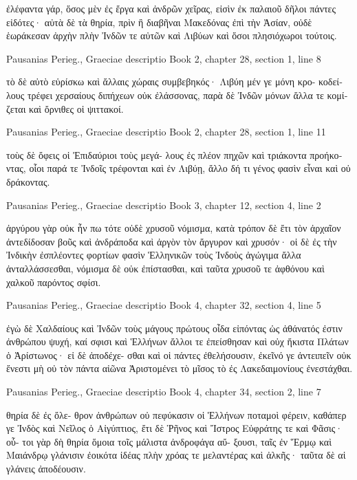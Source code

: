 \documentclass[12pt,letterpaper,twoside,final]{memoir}
\begin{document}
\begin{greek}
                                    ἐλέφαντα γάρ, ὅσος μὲν 
ἐς ἔργα καὶ ἀνδρῶν χεῖρας, εἰσὶν ἐκ παλαιοῦ δῆλοι 
πάντες εἰδότες· αὐτὰ δὲ τὰ θηρία, πρὶν ἢ διαβῆναι 
Μακεδόνας ἐπὶ τὴν Ἀσίαν, οὐδὲ ἑωράκεσαν ἀρχὴν πλὴν 
Ἰνδῶν τε αὐτῶν καὶ Λιβύων καὶ ὅσοι πλησιόχωροι 
τούτοις. 



Pausanias Perieg., Graeciae descriptio 
Book 2, chapter 28, section 1, line 8

                                 τὸ δὲ αὐτὸ εὑρίσκω καὶ 
ἄλλαις χώραις συμβεβηκός· Λιβύη μέν γε μόνη κρο-
κοδείλους τρέφει χερσαίους διπήχεων οὐκ ἐλάσσονας, 
παρὰ δὲ Ἰνδῶν μόνων ἄλλα τε κομίζεται καὶ ὄρνιθες 
οἱ ψιττακοί. 



Pausanias Perieg., Graeciae descriptio 
Book 2, chapter 28, section 1, line 11

               τοὺς δὲ ὄφεις οἱ Ἐπιδαύριοι τοὺς μεγά-  
λους ἐς πλέον πηχῶν καὶ τριάκοντα προήκοντας, οἷοι 
παρά τε Ἰνδοῖς τρέφονται καὶ ἐν Λιβύῃ, ἄλλο δή 
τι γένος φασὶν εἶναι καὶ οὐ δράκοντας. 



Pausanias Perieg., Graeciae descriptio 
Book 3, chapter 12, section 4, line 2

ἀργύρου γὰρ οὐκ ἦν πω τότε οὐδὲ χρυσοῦ νόμισμα, 
κατὰ τρόπον δὲ ἔτι τὸν ἀρχαῖον ἀντεδίδοσαν βοῦς καὶ 
ἀνδράποδα καὶ ἀργὸν τὸν ἄργυρον καὶ χρυσόν· οἱ δὲ 
ἐς τὴν Ἰνδικὴν ἐσπλέοντες φορτίων φασὶν Ἑλληνικῶν 
τοὺς Ἰνδοὺς ἀγώγιμα ἄλλα ἀνταλλάσσεσθαι, νόμισμα 
δὲ οὐκ ἐπίστασθαι, καὶ ταῦτα χρυσοῦ τε ἀφθόνου καὶ 
χαλκοῦ παρόντος σφίσι. 



Pausanias Perieg., Graeciae descriptio 
Book 4, chapter 32, section 4, line 5

          ἐγὼ δὲ Χαλδαίους καὶ Ἰνδῶν τοὺς μάγους 
πρώτους οἶδα εἰπόντας ὡς ἀθάνατός ἐστιν ἀνθρώπου 
ψυχή, καί σφισι καὶ Ἑλλήνων ἄλλοι τε ἐπείσθησαν 
καὶ οὐχ ἥκιστα Πλάτων ὁ Ἀρίστωνος· εἰ δὲ ἀποδέχε-
σθαι καὶ οἱ πάντες ἐθελήσουσιν, ἐκεῖνό γε ἀντειπεῖν 
οὐκ ἔνεστι μὴ οὐ τὸν πάντα αἰῶνα Ἀριστομένει τὸ 
μῖσος τὸ ἐς Λακεδαιμονίους ἐνεστάχθαι. 



Pausanias Perieg., Graeciae descriptio 
Book 4, chapter 34, section 2, line 7

                                      θηρία δὲ ἐς ὄλε-
θρον ἀνθρώπων οὐ πεφύκασιν οἱ Ἑλλήνων ποταμοὶ 
φέρειν, καθάπερ γε Ἰνδὸς καὶ Νεῖλος ὁ Αἰγύπτιος, 
ἔτι δὲ Ῥῆνος καὶ Ἴστρος Εὐφράτης τε καὶ Φᾶσις· οὗ-
τοι γὰρ δὴ θηρία ὅμοια τοῖς μάλιστα ἀνδροφάγα αὔ-
ξουσι, ταῖς ἐν Ἕρμῳ καὶ Μαιάνδρῳ γλάνισιν ἐοικότα 
ἰδέας πλὴν χρόας τε μελαντέρας καὶ ἀλκῆς· ταῦτα δὲ 
αἱ γλάνεις ἀποδέουσιν. 




\end{greek}
\end{document}
